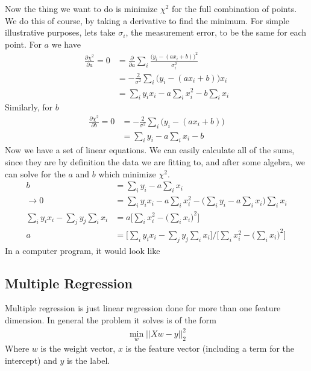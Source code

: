 Now the thing we want to do is minimize $\chi^2$ for the full combination of points. We do this of course, by taking a derivative to find the minimum. For simple illustrative purposes, lets take $\sigma_i$, the measurement error, to be the same for each point. For $a$ we have
\begin{align}
\frac{\partial \chi^2}{\partial a} = 0 &= \frac{\partial}{\partial a} \sum_i \frac{\Big(y_i - (ax_i + b)\Big)^2}{\sigma_i^2} \\
&= - \frac{2}{\sigma^2}\sum_i \Big(y_i - (ax_i+b)\Big)x_i\\
&= \sum_i y_i x_i - a\sum_ix_i^2 - b\sum_i x_i
\end{align}
Similarly, for $b$
\begin{align}
\frac{\partial \chi^2}{\partial b} = 0 &= -\frac{2}{\sigma^2}\sum_i \Big(y_i-(ax_i+b)\Big)\\
&= \sum_i y_i - a \sum_i x_i - b
\end{align}
Now we have a set of linear equations. We can easily calculate all of the sums, since they are by definition the data we are fitting to, and after some algebra, we can solve for the $a$ and $b$ which minimize $\chi^2$.
\begin{align}
b &= \sum_i y_i - a \sum_i x_i\\
\rightarrow 0 &= \sum_i y_i x_i - a\sum_ix_i^2 - \Big(\sum_i y_i - a \sum_i x_i\Big)\sum_i x_i\\
\sum_i y_i x_i  - \sum_j y_j \sum_i x_i &= a\Big[\sum_i x_i^2 -\Big(\sum_i x_i\Big)^2\Big]\\
a &= \Big[\sum_i y_i x_i  - \sum_j y_j \sum_i x_i\Big] /\Big[\sum_i x_i^2 -\Big(\sum_i x_i\Big)^2\Big] 
\end{align}
In a computer program, it would look like







\subsection{Multiple Regression}
Multiple regression is just linear regression done for more than one feature dimension. In general the problem it solves is of the form
\begin{align}
	\min_w||Xw-y||^2_2
\end{align}
Where $w$ is the weight vector, $x$ is the feature vector (including a term for the intercept) and $y$ is the label.

